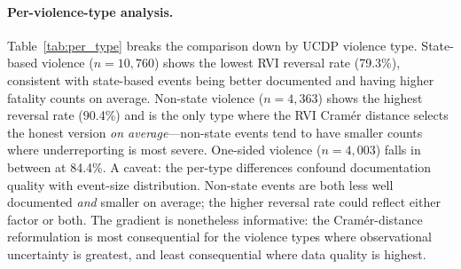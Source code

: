 \paragraph{Per-violence-type analysis.}
Table~\ref{tab:per_type} breaks the comparison down by UCDP violence type. State-based violence ($n = 10{,}760$) shows the lowest RVI reversal rate (79.3\%), consistent with state-based events being better documented and having higher fatality counts on average. Non-state violence ($n = 4{,}363$) shows the highest reversal rate (90.4\%) and is the only type where the RVI Cram\'er distance selects the honest version \emph{on average}---non-state events tend to have smaller counts where underreporting is most severe. One-sided violence ($n = 4{,}003$) falls in between at 84.4\%. A caveat: the per-type differences confound documentation quality with event-size distribution. Non-state events are both less well documented \emph{and} smaller on average; the higher reversal rate could reflect either factor or both. The gradient is nonetheless informative: the Cram\'er-distance reformulation is most consequential for the violence types where observational uncertainty is greatest, and least consequential where data quality is highest.

